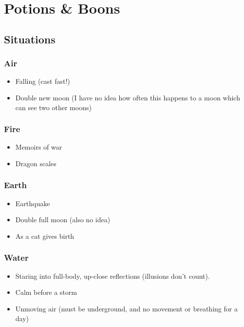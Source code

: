 \chapter[House of Potions \& Boons]{Potions \& Boons}

\section{Situations}

\begin{multicols}{2}

\subsection{Air}

\begin{itemize}
  \item
  Falling (cast fast!)
  \item
  Double new moon (I have no idea how often this happens to a moon which can see two other moons)
\end{itemize}

\subsection{Fire}

\begin{itemize}
  \item
  Memoirs of war
  \item
  Dragon scales
\end{itemize}

\subsection{Earth}

\begin{itemize}
  \item
  Earthquake
  \item
  Double full moon (also no idea)
  \item
  As a cat gives birth
\end{itemize}

\subsection{Water}

\begin{itemize}
  \item
  Staring into full-body, up-close reflections (illusions don't count).
  \item
  Calm before a storm
  \item
  Unmoving air (must be underground, and no movement or breathing for a day)
\end{itemize}


\end{multicols}
